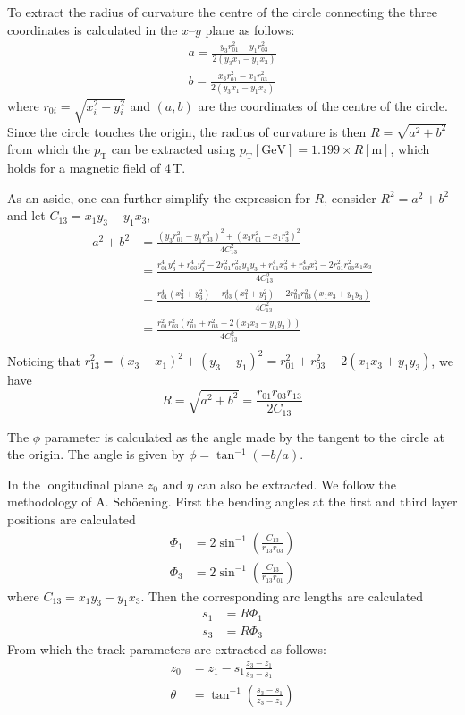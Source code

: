 \documentclass[a4paper, 12pt]{article}
\newcommand{\pt}{\ensuremath{p_{\mathrm{T}}}\xspace}
\begin{document}
To extract the radius of curvature the centre of the circle connecting the three coordinates is calculated in the $x$--$y$ plane as follows:
\begin{align}
  a = \frac{y_3 r_{01}^2 - y_1 r_{03}^2}{2(y_3x_1 - y_1x_3)} \\
  b = \frac{x_3 r_{01}^2 - x_1 r_{03}^2}{2(y_3x_1 - y_1x_3)} 
\end{align}
where $r_{0i} = \sqrt{x^2_i + y^2_i}$ and $(a, b)$ are the coordinates of the centre of the circle. 
Since the circle touches the origin, the radius of curvature is then $R=\sqrt{a^2 + b^2}$ from which the \pt can be extracted using $\pt[\mathrm{GeV}] = 1.199 \times R[\mathrm{m}]$, which holds for a
magnetic field of 4\,T.

As an aside, one can further simplify the expression for $R$, consider $R^2 = a^2+b^2$ and let $C_{13} = x_1 y_3 - y_1 x_3$, 
\begin{align}
  a^2 + b^2 & = \frac{(y_3 r_{01}^2 - y_1 r_{03}^2)^2 + (x_3 r_{01}^2 - x_1 r_3^2)^2}{4C_{13}^2} \\ 
  & = \frac{r^4_{01} y_3^2 + r_{03}^4 y_1^2 - 2 r^2_{01}r^2_{03}y_1 y_3    + r^4_{01} x_3^2 + r_{03}^4 x_1^2 - 2 r^2_{01}r^2_{03}x_1 x_3      }{4C_{13}^2} \\ 
  & = \frac{r_{01}^4 (x_3^2 + y_3^2) + r_{03}^4 (x_1^2 + y_1^2) -2r^2_{01}r^2_{03}(x_1 x_3 + y_1 y_3)}{4 C_{13}^2} \\ 
  & = \frac{r^2_{01}r^2_{03}(r^2_{01} + r^2_{03} -2(x_1 x_3 - y_1 y_3))}{4C_{13}^2} \\ 
\end{align}
Noticing that $r^2_{13} = (x_3 - x_1)^2 + (y_3 - y_1)^2 = r_{01}^2 + r_{03}^2 - 2(x_1 x_3 + y_1y_3)$, we have
\begin{equation}
  R = \sqrt{a^2 + b^2} = \frac{r_{01} r_{03} r_{13}}{2C_{13}}
\end{equation} 


The $\phi$ parameter is calculated as the angle made by the tangent to the circle at the origin. 
The angle is given by $\phi = \tan^{-1}( -b/a)$. 

In the longitudinal plane $z_0$ and $\eta$ can also be extracted. 
We follow the methodology of A. Sch\"oening.
First the bending angles at the first and third layer positions are calculated
\begin{align}
  \Phi_1 & = 2 \sin^{-1} \left( \frac{C_{13}}{r_{13} r_{03} }\right) \\
  \Phi_3 & = 2 \sin^{-1} \left( \frac{C_{13}}{r_{13} r_{01} }\right)
\end{align}
where $C_{13} = x_1 y_3 - y_1 x_3$.
Then the corresponding arc lengths are calculated
\begin{align}
  s_1 & = R \Phi_1 \\
  s_3 & = R \Phi_3 
\end{align}
From which the track parameters are extracted as follows:
\begin{align}
  z_0 & = z_1 - s_1 \frac{z_3 - z_1}{ s_3 - s_1} \\
  \theta & = \tan^{-1} \left( \frac{s_3 - s_1}{ z_3 - z_1} \right)
\end{align}
\end{document}
